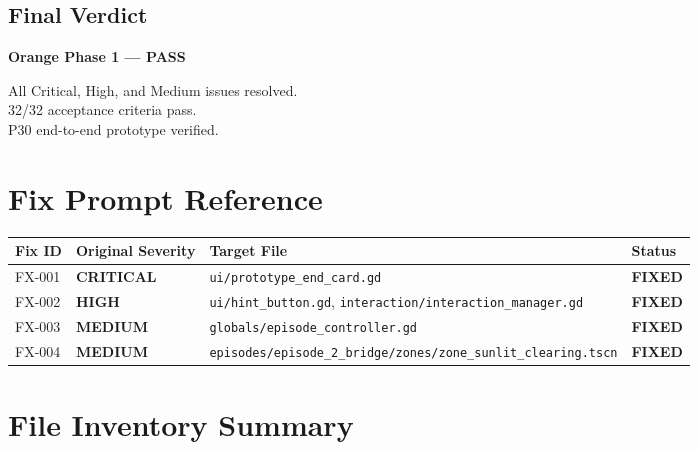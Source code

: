 \documentclass[12pt, a4paper]{article}
\newcommand{\sevCrit}{\textcolor{critred}{\textbf{CRITICAL}}}
\newcommand{\sevHigh}{\textcolor{highoran}{\textbf{HIGH}}}
\newcommand{\sevMed}{\textcolor{medyell}{\textbf{MEDIUM}}}
\newcommand{\sevFixed}{\textcolor{passgre}{\textbf{FIXED}}}
\begin{document}
\subsection{Final Verdict}

\begin{center}
  \large\bfseries\color{passgre}
  Orange Phase 1 — PASS
\end{center}

\begin{center}
  \normalsize All Critical, High, and Medium issues resolved.\\
  32/32 acceptance criteria pass.\\
  P30 end-to-end prototype verified.
\end{center}

\appendix
\section{Fix Prompt Reference}

\begin{center}
\begin{tabular}{llll}
\toprule
\textbf{Fix ID} & \textbf{Original Severity} & \textbf{Target File} & \textbf{Status} \\
\midrule
FX-001 & \sevCrit & \texttt{ui/prototype\_end\_card.gd}               & \sevFixed \\
FX-002 & \sevHigh & \texttt{ui/hint\_button.gd}, \texttt{interaction/interaction\_manager.gd} & \sevFixed \\
FX-003 & \sevMed  & \texttt{globals/episode\_controller.gd}           & \sevFixed \\
FX-004 & \sevMed  & \texttt{episodes/episode\_2\_bridge/zones/zone\_sunlit\_clearing.tscn} & \sevFixed \\
\bottomrule
\end{tabular}
\end{center}

\section{File Inventory Summary}
\end{document}
